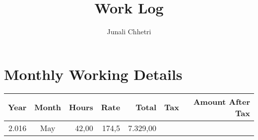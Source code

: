 \documentclass[11pt,A4paper,]{article}
\title{Work Log}
\author{Junali Chhetri}
\date{}
\begin{document}
\maketitle

\section{Monthly Working Details}\label{monthly-working-details}

\begin{longtable}[]{@{}rcrrrrr@{}}
\toprule
\begin{minipage}[b]{0.09\columnwidth}\raggedleft\strut
Year\strut
\end{minipage} & \begin{minipage}[b]{0.13\columnwidth}\centering\strut
Month\strut
\end{minipage} & \begin{minipage}[b]{0.09\columnwidth}\raggedleft\strut
Hours\strut
\end{minipage} & \begin{minipage}[b]{0.09\columnwidth}\raggedleft\strut
Rate\strut
\end{minipage} & \begin{minipage}[b]{0.13\columnwidth}\raggedleft\strut
Total\strut
\end{minipage} & \begin{minipage}[b]{0.09\columnwidth}\raggedleft\strut
Tax\strut
\end{minipage} & \begin{minipage}[b]{0.20\columnwidth}\raggedleft\strut
Amount After Tax\strut
\end{minipage}\tabularnewline
\midrule
\endhead
\begin{minipage}[t]{0.09\columnwidth}\raggedleft\strut
2.016\strut
\end{minipage} & \begin{minipage}[t]{0.13\columnwidth}\centering\strut
May\strut
\end{minipage} & \begin{minipage}[t]{0.09\columnwidth}\raggedleft\strut
42,00\strut
\end{minipage} & \begin{minipage}[t]{0.09\columnwidth}\raggedleft\strut
174,5\strut
\end{minipage} & \begin{minipage}[t]{0.13\columnwidth}\raggedleft\strut
7.329,00\strut
\end{minipage} & \begin{minipage}[t]{0.09\columnwidth}\raggedleft\strut

\end{minipage}
\end{longtable}
\end{document}

